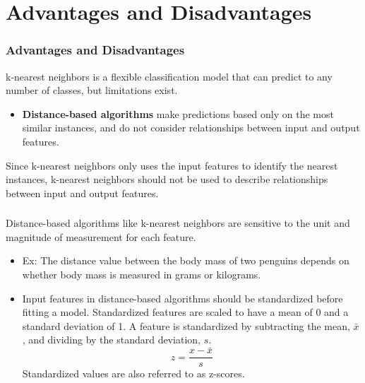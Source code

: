 \documentclass[8pt,dvipsnames]{beamer}
\begin{document}
\section{Advantages and Disadvantages}
\begin{frame}
	\frametitle{Advantages and Disadvantages}
	k-nearest neighbors is a flexible classification model that can predict to any number of classes, but limitations exist.
	\begin{itemize}
		\item 	\textbf{Distance-based algorithms} make predictions based only on the most similar instances, and do not consider relationships between input and output features.
	\end{itemize}
	Since k-nearest neighbors only uses the input features to identify the nearest instances, k-nearest neighbors should not be used to
	describe relationships between input and output features.
\end{frame}

\begin{frame}
	\frametitle{}

	Distance-based algorithms like k-nearest neighbors are sensitive to the unit and magnitude of measurement for each feature.
	\begin{itemize}
		\item Ex: The distance value between the body mass of two penguins depends on whether body mass is measured in grams or kilograms.
		\item Input features in distance-based algorithms should be standardized before fitting a model. Standardized features are scaled to have a mean of 0 and a standard deviation of 1. A feature is standardized by subtracting the mean, \(\bar{x}\), and dividing by the standard deviation, \(s\).
		      $$
			      z=\frac{x-\bar{x}}{s}
		      $$
		      Standardized values are also referred to as z-scores.
	\end{itemize}

\end{frame}
\end{document}

